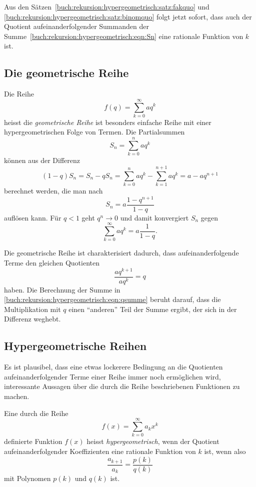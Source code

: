 Aus den Sätzen~\ref{buch:rekursion:hypergeometrisch:satz:fakquo}
und
\ref{buch:rekursion:hypergeometrisch:satz:binomquo}
folgt jetzt sofort, dass auch der Quotient aufeinanderfolgender
Summanden der Summe~\eqref{buch:rekursion:hypergeometrisch:eqn:Sn}
eine rationale Funktion von $k$ ist.

%
%
\subsection{Die geometrische Reihe
\label{buch:rekursion:hypergeometrisch:geometrisch}}
Die Reihe
\[
f(q)
=
\sum_{k=0}^\infty aq^k
\]
heisst die {\em geometrische Reihe} ist besonders einfache
Reihe mit einer hypergeometrischen Folge von Termen.
%
%
Die Partialsummen 
\[
S_n
=
\sum_{k=0}^n aq^k
\]
können aus der Differenz
\begin{equation}
(1-q)S_n
=
S_n - qS_n
=
\sum_{k=0}^n aq^k
-
\sum_{k=1}^{n+1} aq^k
=
a -aq^{n+1}
\label{buch:rekursion:hypergeometrisch:eqn:qsumme}
\end{equation}
berechnet werden, die man nach
\begin{equation}
S_n 
=
a\frac{1-q^{n+1}}{1-q}
\label{buch:rekursion:hypergeometrisch:eqn:geomsumme}
\end{equation}
auflösen kann.
Für $q<1$ geht $q^n\to 0$ und damit konvergiert
$S_n$  gegen
\[
\sum_{k=0}^\infty aq^k
=
a\frac{1}{1-q}.
\]

Die geometrische Reihe ist charakterisiert dadurch, dass aufeinanderfolgende
Terme den gleichen Quotienten
\[
\frac{aq^{k+1}}{aq^k}
=
q
\]
haben.
%
%
Die Berechnung der Summe in 
\eqref{buch:rekursion:hypergeometrisch:eqn:qsumme}
beruht darauf, dass die Multiplikation mit $q$ einen ``anderen''
Teil der Summe ergibt, der sich in der Differenz weghebt.

%
%
\subsection{Hypergeometrische Reihen
\label{buch:rekursion:hypergeometrisch:reihen}}
Es ist plausibel, dass eine etwas lockerere Bedingung an die
Quotienten aufeinanderfolgender Terme einer Reihe immer noch
ermöglichen wird, interessante Aussagen über die durch die
Reihe beschriebenen Funktionen zu machen.

\begin{definition}
\label{buch:rekursion:hypergeometrisch:def:allg}
Eine durch die Reihe
\[
f(x) = \sum_{k=0}^\infty a_k x^k
\]
definierte Funktion $f(x)$ heisst {\em hypergeometrisch},
wenn der Quotient aufeinanderfolgender
Koeffizienten eine rationale Funktion von $k$ ist,
wenn also
\[
\frac{a_{k+1}}{a_k}
=
\frac{p(k)}{q(k)}
\]
mit Polynomen $p(k)$ und $q(k)$ ist.
\end{definition}

